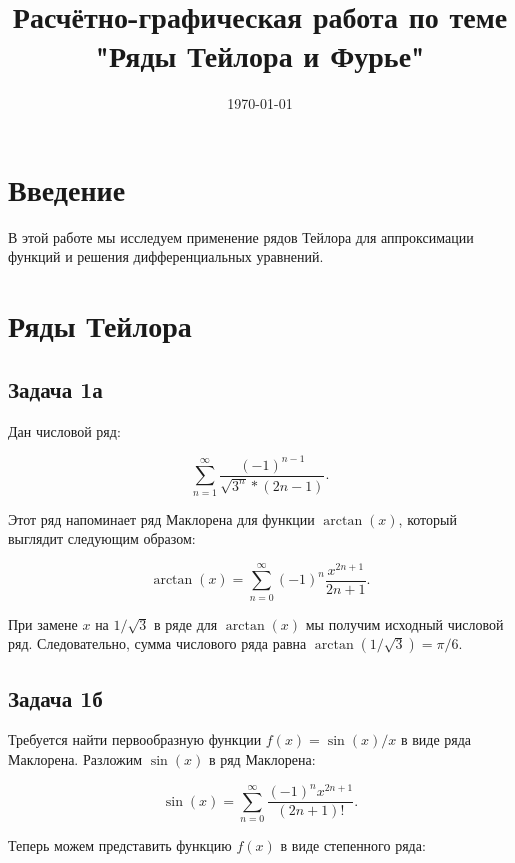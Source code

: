 \documentclass{article}
\begin{document}
\title{Расчётно-графическая работа по теме "Ряды Тейлора и Фурье"}
\date{\today}
\maketitle

\section{Введение}
В этой работе мы исследуем применение рядов Тейлора для аппроксимации функций и решения дифференциальных уравнений.

\section{Ряды Тейлора}

\subsection{Задача 1а}

Дан числовой ряд:

\begin{equation}
\sum_{n=1}^{\infty} \frac{(-1)^{n-1}}{\sqrt{3^n}*(2n-1)}.
\end{equation}

Этот ряд напоминает ряд Маклорена для функции $\arctan(x)$, который выглядит следующим образом:

\begin{equation}
\arctan(x) = \sum_{n=0}^{\infty} (-1)^n \frac{x^{2n+1}}{2n+1}.
\end{equation}

При замене $x$ на $1/\sqrt{3}$ в ряде для $\arctan(x)$ мы получим исходный числовой ряд. Следовательно, сумма числового ряда равна $\arctan(1/\sqrt{3}) = \pi/6$.

\subsection{Задача 1б}

Требуется найти первообразную функции $f(x) = \sin(x)/x$ в виде ряда Маклорена. Разложим $\sin(x)$ в ряд Маклорена:

\begin{equation}
\sin(x) = \sum_{n=0}^{\infty} \frac{(-1)^n x^{2n+1}}{(2n+1)!}.
\end{equation}

Теперь можем представить функцию $f(x)$ в виде степенного ряда:
\end{document}
